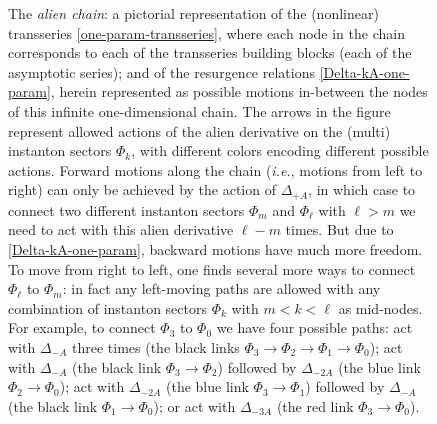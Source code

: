 \documentclass[11pt,a4paper]{article}
\begin{document}
\begin{figure}[t!]
\begin{center}
\end{center}
\vspace*{-50pt}
\caption{The \textit{alien chain}: a pictorial representation of the (nonlinear) transseries \eqref{one-param-transseries}, where each node in the chain corresponds to each of the transseries building blocks (each of the asymptotic series); and of the resurgence relations \eqref{Delta-kA-one-param}, herein represented as possible motions in-between the nodes of this infinite one-dimensional chain. The arrows in the figure represent allowed actions of the alien derivative on the (multi) instanton sectors $\Phi_k$, with different colors encoding different possible actions. Forward motions along the chain (\textit{i.e.}, motions from left to right) can only be achieved by the action of $\Delta_{+A}$, in which case to connect two different instanton sectors $\Phi_m$ and $\Phi_{\ell}$ with $\ell>m$ we need to act with this alien derivative $\ell-m$ times. But due to \eqref{Delta-kA-one-param}, backward motions have much more freedom. To move from right to left, one finds several more ways to connect $\Phi_{\ell}$ to $\Phi_m$: in fact any left-moving paths are allowed with any combination of instanton sectors $\Phi_k$ with $m<k<\ell$ as mid-nodes. For example, to connect $\Phi_3$ to $\Phi_0$ we have four possible paths: act with $\Delta_{-A}$ three times (the black links $\Phi_3 \rightarrow \Phi_2  \rightarrow \Phi_1  \rightarrow \Phi_0$); act with $\Delta_{-A}$ (the black link $\Phi_3 \rightarrow \Phi_2$) followed by $\Delta_{-2A}$ (the blue link $\Phi_2 \rightarrow \Phi_0$); act with $\Delta_{-2A}$ (the blue link $\Phi_3 \rightarrow \Phi_1$) followed by $\Delta_{-A}$ (the black link $\Phi_1 \rightarrow \Phi_0$); or act with $\Delta_{-3A}$ (the red link $\Phi_3 \rightarrow \Phi_0$).}
\label{fig:alien-action-1-param}
\end{figure}
\end{document}
